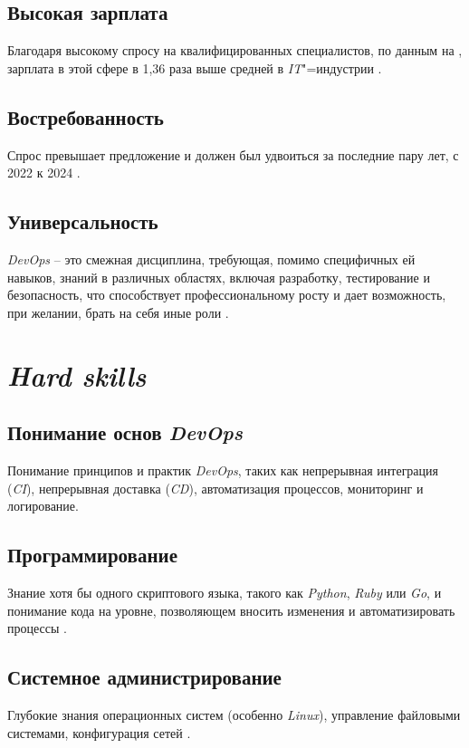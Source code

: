 \documentclass[variant=practice]{bsuir}
\begin{document}
\subsection{Высокая зарплата} Благодаря высокому спросу на квалифицированных
специалистов, по данным на  \cite{devops-habr}, зарплата
в этой сфере в 1,36 раза выше средней в \textit{IT}"=индустрии
\cite{devops-mts}.

\subsection{Востребованность} Спрос превышает предложение и должен был удвоиться
за последние пару лет, с 2022 к 2024 \cite{devops-mts}.

\subsection{Универсальность} \textit{DevOps} -- это смежная дисциплина,
требующая, помимо специфичных ей навыков, знаний в различных областях, включая
разработку, тестирование и безопасность, что способствует профессиональному
росту и дает возможность, при желании, брать на себя иные роли
\cite{devops-mts}.

\section{\textit{Hard skills}}

\subsection{Понимание основ \textit{DevOps}} Понимание принципов и практик
\textit{DevOps}, таких как непрерывная интеграция (\textit{CI}), непрерывная
доставка (\textit{CD}), автоматизация процессов, мониторинг и логирование.

\subsection{Программирование} Знание хотя бы одного скриптового языка, такого
как \textit{Python}, \textit{Ruby} или \textit{Go}, и понимание кода на
уровне, позволяющем вносить изменения и автоматизировать процессы
\cite{devops-mts}.

\subsection{Системное администрирование} Глубокие знания операционных систем
(особенно \textit{Linux}), управление файловыми системами, конфигурация сетей
\cite{devops-mts}.
\end{document}
